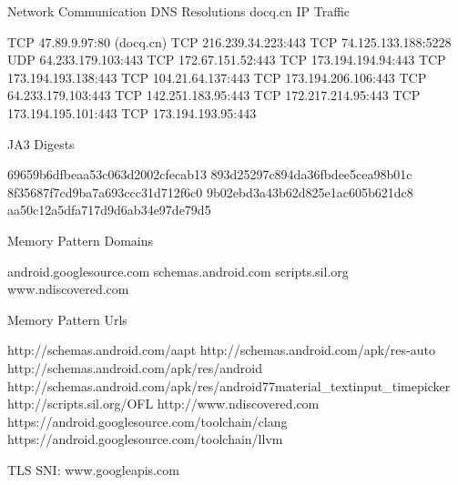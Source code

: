 \documentclass[
]{article}
\newenvironment{Shaded}{}{}
\newcommand{\NormalTok}[1]{#1}
\begin{document}
\begin{Shaded}
\begin{Highlighting}[]
\NormalTok{Network Communication}
\NormalTok{DNS Resolutions}
\NormalTok{docq.cn}
\NormalTok{IP Traffic}

\NormalTok{    TCP 47.89.9.97:80 (docq.cn)}
\NormalTok{    TCP 216.239.34.223:443}
\NormalTok{    TCP 74.125.133.188:5228}
\NormalTok{    UDP 64.233.179.103:443}
\NormalTok{    TCP 172.67.151.52:443}
\NormalTok{    TCP 173.194.194.94:443}
\NormalTok{    TCP 173.194.193.138:443}
\NormalTok{    TCP 104.21.64.137:443}
\NormalTok{    TCP 173.194.206.106:443}
\NormalTok{    TCP 64.233.179.103:443}
\NormalTok{    TCP 142.251.183.95:443}
\NormalTok{    TCP 172.217.214.95:443}
\NormalTok{    TCP 173.194.195.101:443}
\NormalTok{    TCP 173.194.193.95:443}

\NormalTok{JA3 Digests}

\NormalTok{    69659b6dfbeaa53c063d2002cfecab13}
\NormalTok{    893d25297c894da36fbdee5cea98b01c}
\NormalTok{    8f35687f7cd9ba7a693ccc31d712f6c0}
\NormalTok{    9b02ebd3a43b62d825e1ac605b621dc8}
\NormalTok{    aa50c12a5dfa717d9d6ab34e97de79d5}

\NormalTok{Memory Pattern Domains}

\NormalTok{    android.googlesource.com}
\NormalTok{    schemas.android.com}
\NormalTok{    scripts.sil.org}
\NormalTok{    www.ndiscovered.com}

\NormalTok{Memory Pattern Urls}

\NormalTok{    http://schemas.android.com/aapt}
\NormalTok{    http://schemas.android.com/apk/res{-}auto}
\NormalTok{    http://schemas.android.com/apk/res/android}
\NormalTok{    http://schemas.android.com/apk/res/android77material\_textinput\_timepicker}
\NormalTok{    http://scripts.sil.org/OFL}
\NormalTok{    http://www.ndiscovered.com}
\NormalTok{    https://android.googlesource.com/toolchain/clang}
\NormalTok{    https://android.googlesource.com/toolchain/llvm}

\NormalTok{TLS}
\NormalTok{SNI: www.googleapis.com}
\end{Highlighting}
\end{Shaded}
\end{document}
